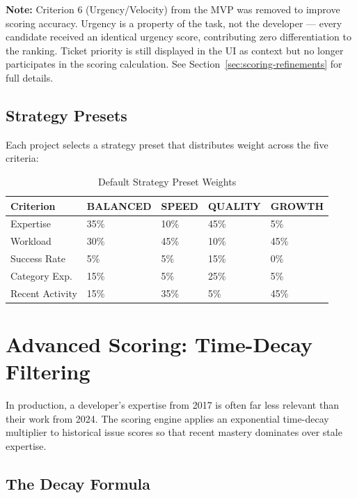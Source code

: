\documentclass[12pt, a4paper]{article}
\begin{document}
\begin{infobox}
\textbf{Note:} Criterion 6 (Urgency/Velocity) from the MVP was removed to improve scoring accuracy. Urgency is a property of the task, not the developer — every candidate received an identical urgency score, contributing zero differentiation to the ranking. Ticket priority is still displayed in the UI as context but no longer participates in the scoring calculation. See Section~\ref{sec:scoring-refinements} for full details.
\end{infobox}

\subsection{Strategy Presets}

Each project selects a strategy preset that distributes weight across the five criteria:

\begin{table}[H]
\centering
\caption{Default Strategy Preset Weights}
\begin{tabularx}{\textwidth}{|l|X|X|X|X|}
\hline
\textbf{Criterion} & \textbf{BALANCED} & \textbf{SPEED} & \textbf{QUALITY} & \textbf{GROWTH} \\
\hline
Expertise        & 35\% & 10\% & 45\% & 5\%  \\
Workload         & 30\% & 45\% & 10\% & 45\% \\
Success Rate     & 5\%  & 5\%  & 15\% & 0\%  \\
Category Exp.    & 15\% & 5\%  & 25\% & 5\%  \\
Recent Activity  & 15\% & 35\% & 5\%  & 45\% \\
\hline
\end{tabularx}
\end{table}


\section{Advanced Scoring: Time-Decay Filtering}

In production, a developer's expertise from 2017 is often far less relevant than their work from 2024. The scoring engine applies an exponential time-decay multiplier to historical issue scores so that recent mastery dominates over stale expertise.

\subsection{The Decay Formula}
\end{document}
